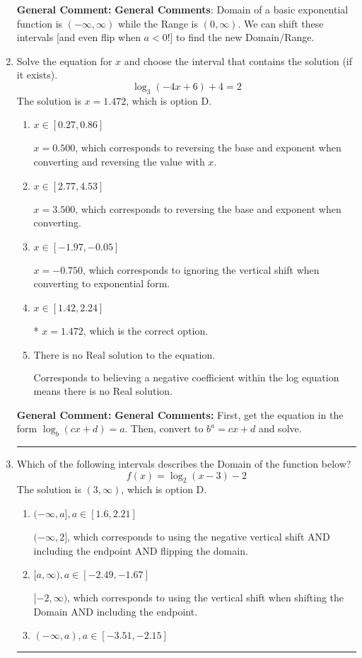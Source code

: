 \documentclass{extbook}[14pt]
\newcommand{\litem}[1]{\item #1

\rule{\textwidth}{0.4pt}}
\begin{document}
\begin{enumerate}
{\textbf{General Comment:} \textbf{General Comments}: Domain of a basic exponential function is $(-\infty, \infty)$ while the Range is $(0, \infty)$. We can shift these intervals [and even flip when $a<0$!] to find the new Domain/Range.
}
\litem{
Solve the equation for $x$ and choose the interval that contains the solution (if it exists).
\[ \log_{3}{(-4x+6)}+4 = 2 \]The solution is \( x = 1.472 \), which is option D.\begin{enumerate}[label=\Alph*.]
\item \( x \in [0.27, 0.86] \)

$x = 0.500$, which corresponds to reversing the base and exponent when converting and reversing the value with $x$.
\item \( x \in [2.77, 4.53] \)

$x = 3.500$, which corresponds to reversing the base and exponent when converting.
\item \( x \in [-1.97, -0.05] \)

$x = -0.750$, which corresponds to ignoring the vertical shift when converting to exponential form.
\item \( x \in [1.42, 2.24] \)

* $x = 1.472$, which is the correct option.
\item \( \text{There is no Real solution to the equation.} \)

Corresponds to believing a negative coefficient within the log equation means there is no Real solution.
\end{enumerate}

\textbf{General Comment:} \textbf{General Comments:} First, get the equation in the form $\log_b{(cx+d)} = a$. Then, convert to $b^a = cx+d$ and solve.
}
\litem{
Which of the following intervals describes the Domain of the function below?
\[ f(x) = \log_2{(x-3)}-2 \]The solution is \( (3, \infty) \), which is option D.\begin{enumerate}[label=\Alph*.]
\item \( (-\infty, a], a \in [1.6, 2.21] \)

$(-\infty, 2]$, which corresponds to using the negative vertical shift AND including the endpoint AND flipping the domain.
\item \( [a, \infty), a \in [-2.49, -1.67] \)

$[-2, \infty)$, which corresponds to using the vertical shift when shifting the Domain AND including the endpoint.
\item \( (-\infty, a), a \in [-3.51, -2.15] \)


\end{enumerate}}
\end{enumerate}
\end{document}
